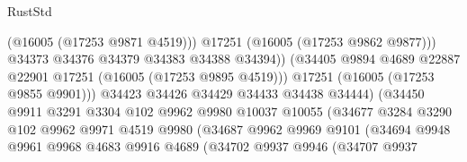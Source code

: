 \begin{lexlean}{RustStd}
\begin{coremodule}
                                            (@16005 (@17253 @9871 @4519)))
                                          @17251
                                          (@16005 (@17253 @9862 @9877)))
                                        @34373
                                        @34376
                                        @34379
                                        @34383
                                        @34388
                                        @34394))
                                    (@34405
                                      @9894
                                      @4689
                                      @22887
                                      @22901
                                      @17251
                                      (@16005 (@17253 @9895 @4519)))
                                    @17251
                                    (@16005 (@17253 @9855 @9901)))
                                  @34423
                                  @34426
                                  @34429
                                  @34433
                                  @34438
                                  @34444)
                                (@34450
                                  @9911
                                  @3291
                                  @3304
                                  @102
                                  @9962
                                  @9980
                                  @10037
                                  @10055
                                  (@34677
                                    @3284
                                    @3290
                                    @102
                                    @9962
                                    @9971
                                    @4519
                                    @9980
                                    (@34687
                                      @9962
                                      @9969
                                      @9101
                                      (@34694
                                        @9948
                                        @9961
                                        @9968
                                        @4683
                                        @9916
                                        @4689
                                        (@34702
                                          @9937
                                          @9946
                                          (@34707
                                            @9937

\end{coremodule}
\end{lexlean}
